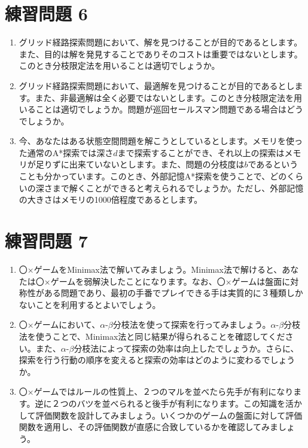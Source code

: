 \section{練習問題 6}

\begin{enumerate}
	\item グリッド経路探索問題において、解を見つけることが目的であるとします。また、目的は解を発見することでありそのコストは重要ではないとします。このとき分枝限定法を用いることは適切でしょうか。

	\item グリッド経路探索問題において、最適解を見つけることが目的であるとします。また、非最適解は全く必要ではないとします。このとき分枝限定法を用いることは適切でしょうか。問題が巡回セールスマン問題である場合はどうでしょうか。

	\item 今、あなたはある状態空間問題を解こうとしているとします。メモリを使った通常のA*探索では深さ$d$まで探索することができ、それ以上の探索はメモリが足りずに出来ていないとします。また、問題の分枝度は$b$であるということも分かっています。このとき、外部記憶A*探索を使うことで、どのくらいの深さまで解くことができると考えられるでしょうか。ただし、外部記憶の大きさはメモリの1000倍程度であるとします。
\end{enumerate}


\section{練習問題 7}

\begin{enumerate}
    \item 〇×ゲームをMinimax法で解いてみましょう。Minimax法で解けると、あなたは〇×ゲームを弱解決したことになります。なお、〇×ゲームは盤面に対称性がある問題であり、最初の手番でプレイできる手は実質的に３種類しかないことを利用するとよいでしょう。

    \item 〇×ゲームにおいて、$\alpha$-$\beta$分枝法を使って探索を行ってみましょう。$\alpha$-$\beta$分枝法を使うことで、Minimax法と同じ結果が得られることを確認してください。また、$\alpha$-$\beta$分枝法によって探索の効率は向上したでしょうか。さらに、探索を行う行動の順序を変えると探索の効率はどのように変わるでしょうか。

    \item 〇×ゲームではルールの性質上、２つのマルを並べたら先手が有利になります。逆に２つのバツを並べられると後手が有利になります。この知識を活かして評価関数を設計してみましょう。いくつかのゲームの盤面に対して評価関数を適用し、その評価関数が直感に合致しているかを確認してみましょう。
\end{enumerate}



